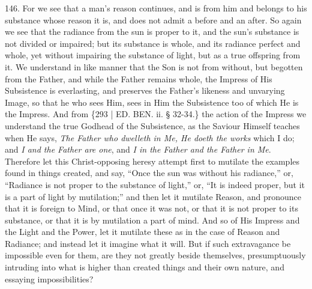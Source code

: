 146. For we see that a man's
reason continues, and is from him and belongs to his substance whose
reason it is, and does not admit a before and an after. So again we
see that the radiance from the sun is proper to it, and the sun's
substance is not divided or impaired; but its substance is whole, and
its radiance perfect and whole, yet without impairing the substance of
light, but as a true offspring from it. We understand in like manner
that the Son is not from without, but begotten from the Father, and
while the Father remains whole, the Impress of His Subsistence is
everlasting, and preserves the Father's likeness and unvarying Image,
so that he who sees Him, sees in Him the Subsistence too of which He
is the Impress. And from \{293 | ED. BEN.
ii. § 32-34.\} the action of the Impress we understand the true Godhead of
the Subsistence, as the Saviour Himself teaches when He says, \emph{The
Father who dwelleth in Me, He doeth the works} which I do; and \emph{I
and the Father are one}, and \emph{I in the Father and the Father in
Me}. Therefore let this Christ-opposing heresy attempt first to
mutilate the examples found in things created, and say, ``Once the sun
was without his radiance,'' or, ``Radiance is not proper to the
substance of light,'' or, ``It is indeed proper, but it is a part of
light by mutilation;'' and then let it mutilate Reason, and pronounce
that it is foreign to Mind, or that once it was not, or that it is not
proper to its substance, or that it is by mutilation a part of mind.
And so of His Impress and the Light and the Power, let it mutilate
these as in the case of Reason and Radiance; and instead let it
imagine what it will. But if such extravagance be impossible even for
them, are they not greatly beside themselves, presumptuously intruding
into what is higher than created things and their own nature, and
essaying impossibilities?

